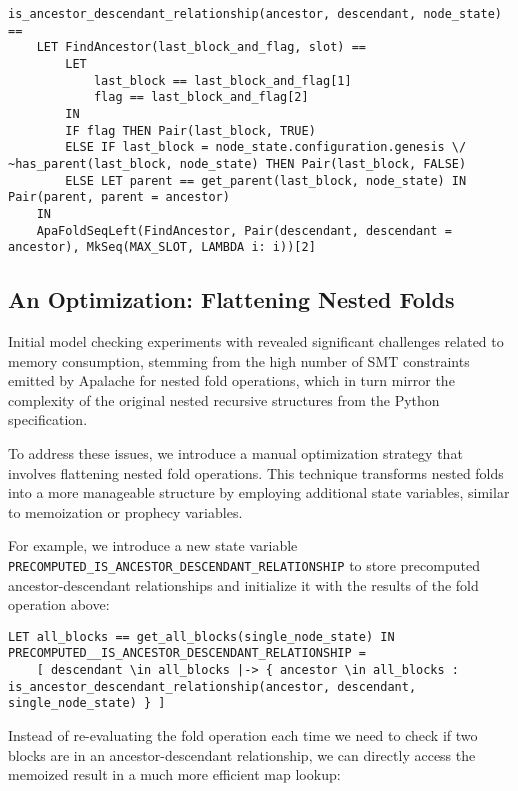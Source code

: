 \begin{lstlisting}[language=tla]
is_ancestor_descendant_relationship(ancestor, descendant, node_state) ==
    LET FindAncestor(last_block_and_flag, slot) ==
        LET
            last_block == last_block_and_flag[1]
            flag == last_block_and_flag[2]
        IN
        IF flag THEN Pair(last_block, TRUE)
        ELSE IF last_block = node_state.configuration.genesis \/ ~has_parent(last_block, node_state) THEN Pair(last_block, FALSE)
        ELSE LET parent == get_parent(last_block, node_state) IN Pair(parent, parent = ancestor)
    IN
    ApaFoldSeqLeft(FindAncestor, Pair(descendant, descendant = ancestor), MkSeq(MAX_SLOT, LAMBDA i: i))[2]
\end{lstlisting}

\subsection{An Optimization: Flattening Nested Folds}

Initial model checking experiments with \SpecTwo{} revealed significant
challenges related to memory consumption, stemming from the high number of SMT
constraints emitted by Apalache for nested fold operations, which in turn mirror
the complexity of the original nested recursive structures from the Python
specification.

To address these issues, we introduce a manual optimization strategy that
involves flattening nested fold operations. This technique transforms nested
folds into a more manageable structure by employing additional \tlap{} state
variables, similar to memoization or prophecy variables.

For example, we introduce a new \tlap{} state variable
\texttt{PRECOMPUTED\_IS\_ANCESTOR\_DESCENDANT\_RELATIONSHIP} to store
precomputed ancestor-descendant relationships and initialize it with the results
of the fold operation above:

\begin{lstlisting}[language=tla]
LET all_blocks == get_all_blocks(single_node_state) IN
PRECOMPUTED__IS_ANCESTOR_DESCENDANT_RELATIONSHIP =
    [ descendant \in all_blocks |-> { ancestor \in all_blocks : is_ancestor_descendant_relationship(ancestor, descendant, single_node_state) } ]
\end{lstlisting}

Instead of re-evaluating the fold operation each time we need to check if two
blocks are in an ancestor-descendant relationship, we can directly access the
memoized result in a much more efficient map lookup:


